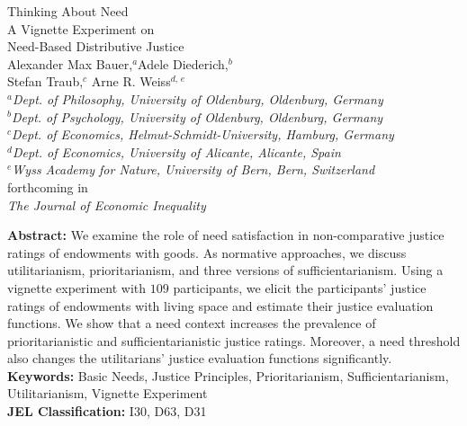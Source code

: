 \documentclass[12pt]{scrartcl}
\begin{document}
\thispagestyle{empty}
\renewcommand{\thefootnote}{\fnsymbol{footnote}}
\begin{center}
{\LARGE Thinking About Need}\\\vspace{2ex}
{\Large A Vignette Experiment on\\[1ex] Need-Based Distributive Justice}\\ \vspace{6ex}
{\large Alexander Max Bauer,$^a$\footnotemark[1] Adele Diederich,$^b$\\Stefan Traub,$^{c}$ Arne R. Weiss$^{d,\,e}$}\\ \vspace{3ex}
\textsl{\small $^{a}$Dept. of Philosophy, University of Oldenburg, Oldenburg, Germany}\\\vspace{1ex}
\textsl{\small $^{b}$Dept. of Psychology, University of Oldenburg, Oldenburg, Germany}\\\vspace{1ex}
\textsl{\small $^{c}$Dept. of Economics, Helmut-Schmidt-University, Hamburg, Germany}\\\vspace{1ex}
\textsl{\small $^{d}$Dept. of Economics, University of Alicante, Alicante, Spain}\\\vspace{1ex}
\textsl{\small $^{e}$Wyss Academy for Nature, University of Bern, Bern, Switzerland}\\\vspace{8ex}
forthcoming in\\\textit{The Journal of Economic Inequality}

\end{center}

\vspace{\fill}

\noindent\textbf{Abstract:} We examine the role of need satisfaction in non-comparative justice ratings of endowments with goods.
As normative approaches, we discuss utilitarianism, prioritarianism, and three versions of sufficientarianism.
Using a vignette experiment with $109$ participants, we elicit the participants' justice ratings of endowments with living space and estimate their justice evaluation functions.
We show that a need context increases the prevalence of prioritarianistic and sufficientarianistic justice ratings.
Moreover, a need threshold also changes the utilitarians' justice evaluation functions significantly.
\\[2ex]
\noindent\textbf{Keywords:} Basic Needs, Justice Principles, Prioritarianism, Sufficientarianism, Utilitarianism, Vignette Experiment\\[2ex]
\textbf{JEL Classification:} I30, D63, D31
\end{document}
